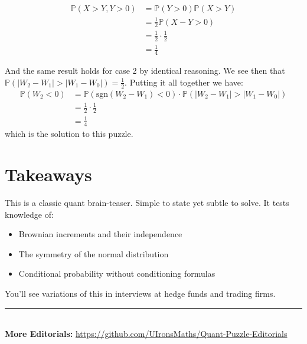 \documentclass[12pt]{article}
\begin{document}
\begin{align*}
\mathbb{P}(X>Y, Y>0) &= \mathbb{P}(Y>0)\mathbb{P}(X>Y)\\
&= \frac{1}{2}\mathbb{P}(X-Y>0)\\
&= \frac{1}{2}\cdot\frac{1}{2}\\
&= \frac{1}{4}
\end{align*}

And the same result holds for case 2 by identical reasoning. We see then that $\mathbb{P}(|W_2-W_1| > |W_1 - W_0|) = \frac{1}{2}$.
Putting it all together we have:
\begin{align*}
    \mathbb{P}(W_2 < 0) &= \mathbb{P}(\text{sgn}(W_2-W_1) < 0)\cdot\mathbb{P}(|W_2-W_1| > |W_1 - W_0|)\\
    &= \frac{1}{2}\cdot\frac{1}{2}\\
    &= \frac{1}{4}
\end{align*}
which is the solution to this puzzle.

\bigskip

\section*{Takeaways}
This is a classic quant brain-teaser. Simple to state yet subtle to solve. It tests knowledge of:
\begin{itemize}
    \item Brownian increments and their independence
    \item The symmetry of the normal distribution
    \item Conditional probability without conditioning formulas
\end{itemize}
You’ll see variations of this in interviews at hedge funds and trading firms.

\vspace*{\fill}
\begin{center}
    \rule{\linewidth}{0.5pt} \\
    \textbf{More Editorials:} \href{https://github.com/UIronsMaths/Quant-Puzzle-Editorials}{https://github.com/UIronsMaths/Quant-Puzzle-Editorials}
\end{center}
\end{document}
